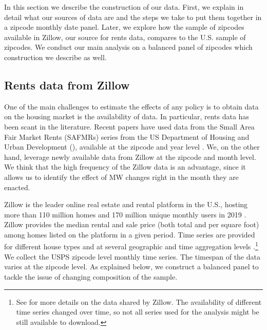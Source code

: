 
In this section we describe the construction of our data. First, we explain in detail
what our sources of data are and the steps we take to put them together in a zipcode
monthly date panel. Later, we explore how the sample of zipcodes available in Zillow, 
our source for rents data, compares to the U.S. sample of zipcodes. We conduct our 
main analysis on a balanced panel of zipcodes which construction we describe as well.

\subsection{Rents data from Zillow}

One of the main challenges to estimate the effects of any policy is to obtain data on
the housing market is the availability of data. In particular, rents data has been scant
in the literature. Recent papers have used data from the Small Area Fair Market Rents 
(SAFMRs) series from the US Department of Housing and Urban Development (\citeyear{hud}), 
available at the zipcode and year level \parencite{Tidemann2018, Yamagishi2019}. We, 
on the other hand, leverage newly available data from Zillow at the zipcode and month 
level. We think that the high frequency of the Zillow data is an advantage, since it 
allows us to identify the effect of MW changes right in the month they are enacted.

Zillow is the leader online real estate and rental platform in the U.S., hosting more 
than 110 million homes and 170 million unique monthly users in 2019 
\parencite{ZillowFacts}. Zillow provides the median rental and sale price (both 
total and per square foot) among homes listed on the platform in a given period. Time 
series are provided for different house types and at several geographic and time 
aggregation levels \parencite{ZillowData}.\footnote{See \textcite{ZillowData} for 
	more details on the data shared by Zillow. The availability of different time 
	series changed over time, so not all series used for the analysis might be still 
	available to download.}
We collect the USPS zipcode level monthly time series. The timespan of the data 
varies at the zipcode level. As explained below, we construct a balanced panel to
tackle the issue of changing composition of the sample.

